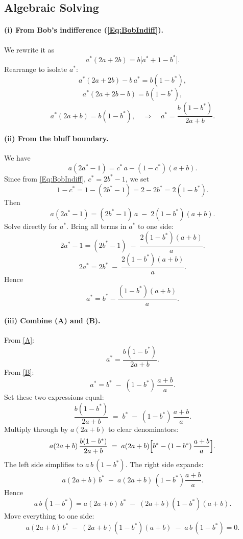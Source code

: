 \documentclass{article}
\begin{document}
\subsection{Algebraic Solving}

\paragraph{(i) From Bob's indifference (\ref{Eq:BobIndiff}).}
We rewrite it as
\[
a^*(2a+2b) = b\bigl[a^* + 1 - b^*\bigr].
\]
Rearrange to isolate $a^*$:
\[
a^*(2a + 2b) - b\,a^* = b(1 - b^*),
\]
\[
a^*(2a + 2b - b) = b(1 - b^*),
\]
\[
a^*(2a + b) = b(1 - b^*),
\quad\Longrightarrow\quad
a^* = \frac{b\,(1 - b^*)}{\,2a + b\,}.
\label{A}
\tag{A}
\]

\paragraph{(ii) From the bluff boundary.}
We have
\[
a(2a^*-1) = c^*\,a - (1-c^*)(a+b).
\]
Since from \eqref{Eq:BobIndiff}, $c^*=2b^*-1$, we set 
\[
1 - c^* = 1 - (2b^* -1) = 2 - 2b^* = 2(1 - b^*).
\]
Then
\[
a(2a^* -1) 
= (2b^*-1)\,a \;-\; 2(1-b^*)(a+b).
\]
Solve directly for $a^*$.  Bring all terms in $a^*$ to one side:
\[
2a^* -1 = (2b^* -1) \;-\; \frac{2(1-b^*)(a+b)}{a}.
\]
\[
2a^* = 2b^* \;-\; \frac{2(1-b^*)(a+b)}{a}.
\]
Hence
\begin{equation}
    a^* = b^* - \frac{(1-b^*)(a+b)}{\,a\,}.
    \tag{B}
    \label{B}
\end{equation}



\paragraph{(iii) Combine (A) and (B).}
From \eqref{A}:
\[
a^* = \frac{ b(1 - b^*) }{\,2a + b\,}.
\]
From \eqref{B}:
\[
a^* = b^* \;-\; (1-b^*)\,\frac{a+b}{\,a\,}.
\]
Set these two expressions equal:
\[
\frac{b(1 - b^*)}{2a + b}
\;=\;
b^* \;-\; (1-b^*)\,\frac{a+b}{a}.
\]
Multiply through by $a(2a+b)$ to clear denominators:
\[
a(2a+b)\,\frac{b(1-b^*)}{2a+b}
\;=\;
a(2a+b)\Bigl[b^* - (1-b^*)\,\frac{a+b}{a}\Bigr].
\]
The left side simplifies to $a\,b\,(1-b^*)$.  The right side expands:
\[
a(2a+b)\,b^*
\;-\;
a(2a+b)\,(1-b^*)\frac{a+b}{a}.
\]
Hence
\[
a\,b\,(1-b^*)
=
a(2a+b)\,b^*
\;-\;
(2a+b)(1-b^*)(a+b).
\]
Move everything to one side:
\[
a(2a+b)\,b^*
\;-\;
(2a+b)(1-b^*)(a+b)
\;-\;
a\,b\,(1-b^*)
= 0.
\]
\end{document}
